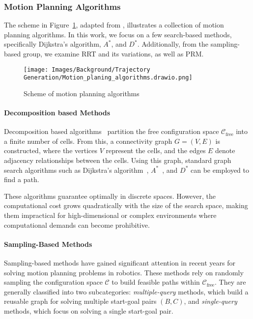 \subsubsection{Motion Planning Algorithms}

The scheme in Figure~\ref{fig:background:trajectory generation:motion planning algorithms}, adapted from \cite{InesBatista2022Thesis}, illustrates a collection of motion planning algorithms. In this work, we focus on a few search-based methods, specifically Dijkstra’s algorithm, $A^{*}$, and $D^{*}$. Additionally, from the sampling-based group, we examine RRT and its variations, as well as PRM.

\begin{figure}[H]
    \centering
    \texttt{[image: Images/Background/Trajectory Generation/Motion\_planing\_algorithms.drawio.png]}
    \caption{Scheme of motion planning algorithms~\cite{InesBatista2022Thesis}}
    \label{fig:background:trajectory generation:motion planning algorithms}
\end{figure}

\paragraph{Decomposition based Methods}

Decomposition based algorithms~\cite{latombe2012robot} partition the free configuration space $\mathcal{C}_{\text{free}}$ into a finite number of cells. From this, a connectivity graph $G = (V, E)$ is constructed, where the vertices $V$ represent the cells, and the edges $E$ denote adjacency relationships between the cells. Using this graph, standard graph search algorithms such as Dijkstra’s algorithm~\cite{dijkstra2022note}, $A^{*}$~\cite{A-start-original}, and $D^{*}$ can be employed to find a path.

These algorithms guarantee optimally in discrete spaces. However, the computational cost grows quadratically with the size of the search space, making them impractical for high-dimensional or complex environments where computational demands can become prohibitive.

\paragraph{Sampling-Based Methods}

Sampling-based methods have gained significant attention in recent years for solving motion planning problems in robotics. These methods rely on randomly sampling the configuration space $\mathcal{C}$ to build feasible paths within $\mathcal{C}_{\text{free}}$. They are generally classified into two subcategories: \textit{multiple-query} methods, which build a reusable graph for solving multiple start-goal pairs $(B, C)$, and \textit{single-query} methods, which focus on solving a single start-goal pair.

